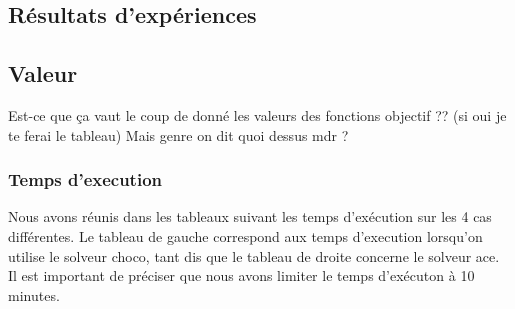 \documentclass[a4paper, 10pt]{article}
\begin{document}
    \subsection{Résultats d'expériences}

      \subsection{Valeur}

      Est-ce que ça vaut le coup de donné les valeurs des fonctions objectif ?? (si oui je te ferai le tableau) Mais genre on dit quoi dessus mdr ?

      \subsubsection{Temps d'execution}

      Nous avons réunis dans les tableaux suivant les temps d'exécution sur les 4 cas différentes. Le tableau de gauche correspond aux temps d'execution lorsqu'on utilise le solveur choco, tant dis que le tableau de droite concerne le solveur ace. Il est important de préciser que nous avons limiter le temps d'exécuton à 10 minutes.
\end{document}
